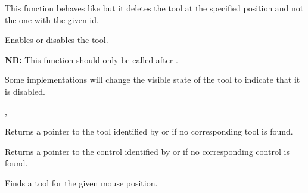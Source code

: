 
This function behaves like  but it
deletes the tool at the specified position and not the one with the given id.


\label{wxtoolbarenabletool}


Enables or disables the tool.




{\bf NB:} This function should only be called after 
.


Some implementations will change the visible state of the tool to indicate that it is disabled.


,\rtfsp
{}


\label{wxtoolbarfindbyid}


Returns a pointer to the tool identified by  or
\NULL if no corresponding tool is found.


\label{wxtoolbarfindcontrol}


Returns a pointer to the control identified by  or 
\NULL if no corresponding control is found.


\label{wxtoolbarfindtoolforposition}


Finds a tool for the given mouse position.




